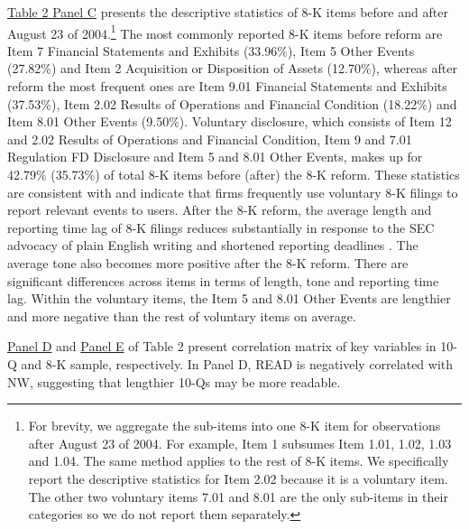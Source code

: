 \documentclass[letterpaper,12pt]{article}
\begin{document}
\begin{spacing}{1.5}
\hyperref[T2PC]{Table 2 Panel C} presents the descriptive statistics of 8-K items before and after August 23 of 2004.\footnote{For brevity, we aggregate the sub-items into one 8-K item for observations after August 23 of 2004. For example, Item 1 subsumes Item 1.01, 1.02, 1.03 and 1.04. The same method applies to the rest of 8-K items. We specifically report the descriptive statistics for Item 2.02 because it is a voluntary item. The other two voluntary items 7.01 and 8.01 are the only sub-items in their categories so we do not report them separately.} The most commonly reported 8-K items before reform are Item 7 Financial Statements and Exhibits (33.96\%), Item 5 Other Events (27.82\%) and Item 2 Acquisition or Disposition of Assets (12.70\%), whereas after reform the most frequent ones are Item 9.01 Financial Statements and Exhibits (37.53\%), Item 2.02 Results of Operations and Financial Condition (18.22\%) and Item 8.01 Other Events (9.50\%). Voluntary disclosure, which consists of Item 12 and 2.02 Results of Operations and Financial Condition, Item 9 and 7.01 Regulation FD Disclosure and Item 5 and 8.01 Other Events, makes up for 42.79\% (35.73\%) of total 8-K items before (after) the 8-K reform. These statistics are consistent with  and indicate that firms frequently use voluntary 8-K filings to report relevant events to users. After the 8-K reform, the average length and reporting time lag of 8-K filings reduces substantially in response to the SEC advocacy of plain English writing \cite{secDivisionCorporateFinance1999} and shortened reporting deadlines \cite{secFinalRuleAdditional2004}. The average tone also becomes more positive after the 8-K reform. There are significant differences across items in terms of length, tone and reporting time lag. Within the voluntary items, the Item 5 and 8.01 Other Events are lengthier and more negative than the rest of voluntary items on average.

\hyperref[T2PD]{Panel D} and \hyperref[T2PE]{Panel E} of Table 2 present correlation matrix of key variables in 10-Q and 8-K sample, respectively. In Panel D, READ is negatively correlated with NW, suggesting that lengthier 10-Qs may be more readable.


\end{spacing}
\end{document}
